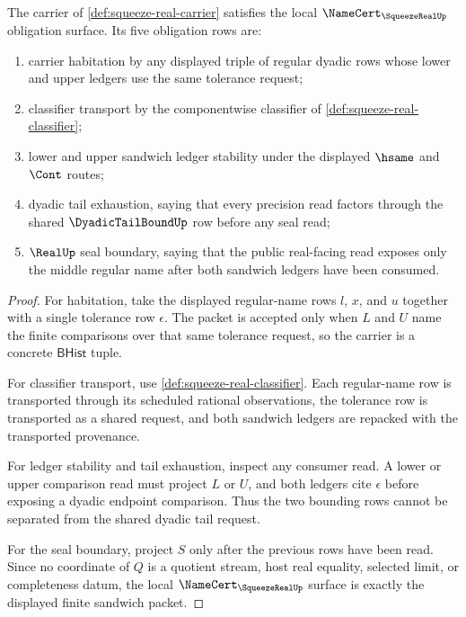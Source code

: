 \begin{theorem}
\label{thm:squeeze-real-namecert-obligations}
The carrier of \autoref{def:squeeze-real-carrier} satisfies the local $\NameCert_{\SqueezeRealUp}$ obligation surface. Its five obligation rows are:
\begin{enumerate}
\item carrier habitation by any displayed triple of regular dyadic rows whose lower and upper ledgers use the same tolerance request;
\item classifier transport by the componentwise classifier of \autoref{def:squeeze-real-classifier};
\item lower and upper sandwich ledger stability under the displayed $\hsame$ and $\Cont$ routes;
\item dyadic tail exhaustion, saying that every precision read factors through the shared $\DyadicTailBoundUp$ row before any seal read;
\item $\RealUp$ seal boundary, saying that the public real-facing read exposes only the middle regular name after both sandwich ledgers have been consumed.
\end{enumerate}
\end{theorem}
\begin{proof}
For habitation, take the displayed regular-name rows $l$, $x$, and $u$ together with a single tolerance row $\epsilon$. The packet is accepted only when $L$ and $U$ name the finite comparisons over that same tolerance request, so the carrier is a concrete $\mathsf{BHist}$ tuple.

For classifier transport, use \autoref{def:squeeze-real-classifier}. Each regular-name row is transported through its scheduled rational observations, the tolerance row is transported as a shared request, and both sandwich ledgers are repacked with the transported provenance.

For ledger stability and tail exhaustion, inspect any consumer read. A lower or upper comparison read must project $L$ or $U$, and both ledgers cite $\epsilon$ before exposing a dyadic endpoint comparison. Thus the two bounding rows cannot be separated from the shared dyadic tail request.

For the seal boundary, project $S$ only after the previous rows have been read. Since no coordinate of $Q$ is a quotient stream, host real equality, selected limit, or completeness datum, the local $\NameCert_{\SqueezeRealUp}$ surface is exactly the displayed finite sandwich packet.
\end{proof}

